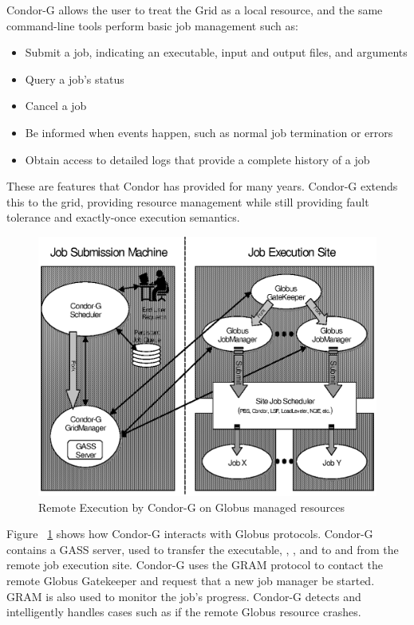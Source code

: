 Condor-G allows the user to treat the Grid as a local resource,
and the same command-line tools perform basic job management such as:
\begin{itemize}
\item Submit a job, indicating an executable, input and output files,
and arguments
\item Query a job's status
\item Cancel a job
\item Be informed when events happen,
such as normal job termination or errors
\item Obtain access to detailed logs that provide a complete history of a job
\end{itemize}

These are features that Condor has provided for many years.
Condor-G extends this to the grid,
providing resource management 
while still providing fault tolerance and exactly-once execution 
semantics. 

\begin{figure}[ht!]
\centerline{\includegraphics{condor-g/gfig1.eps}}
\caption{\label{fig:condorg}Remote Execution by Condor-G on Globus managed resources}
\end{figure}

Figure ~\ref{fig:condorg} shows how Condor-G interacts with Globus protocols.
Condor-G contains a GASS server, used to transfer the executable,
, , and  to and from
the remote job execution site.
Condor-G uses the GRAM protocol to contact the remote Globus Gatekeeper
and request that a new job manager be started.
GRAM is also used to monitor the job's progress.
Condor-G detects and intelligently handles cases
such as if the remote Globus resource crashes.

